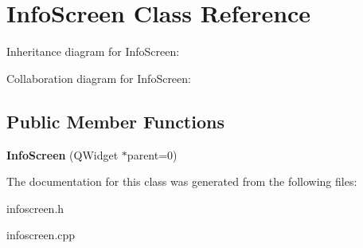 \hypertarget{class_info_screen}{\section{Info\-Screen Class Reference}
\label{class_info_screen}
}


Inheritance diagram for Info\-Screen\-:


Collaboration diagram for Info\-Screen\-:
\subsection*{Public Member Functions}
\begin{DoxyCompactItemize}
\item 
\hypertarget{class_info_screen_a334bc1b328e13d04889b2f166806de9e}{{\bfseries Info\-Screen} (Q\-Widget $\ast$parent=0)}\label{class_info_screen_a334bc1b328e13d04889b2f166806de9e}

\end{DoxyCompactItemize}


The documentation for this class was generated from the following files\-:\begin{DoxyCompactItemize}
\item 
infoscreen.\-h\item 
infoscreen.\-cpp\end{DoxyCompactItemize}
